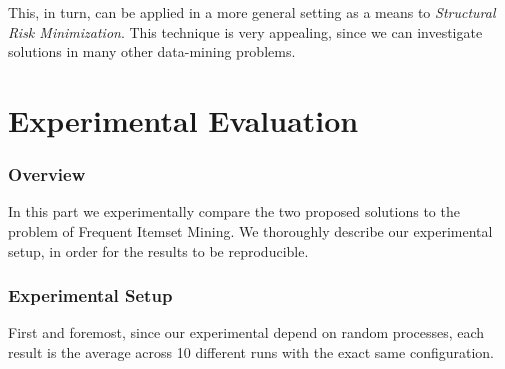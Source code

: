 \documentclass[11pt]{sigplanconf}
\renewcommand\it{\textit}
\begin{document}
This, in turn, can be applied in a more general setting as a means to \it{Structural Risk Minimization}. This technique is very appealing, since we can investigate solutions in many other data-mining problems.

\cleardoublepage
\part{Experimental Evaluation}\label{part2}

\section{Overview}
In this part we experimentally compare the two proposed solutions to the problem of Frequent Itemset Mining.
We thoroughly describe our experimental setup, in order for the results to be reproducible.

\section{Experimental Setup}
First and foremost, since our experimental depend on random processes, each result is the average across 10 different runs with the exact same configuration.
\end{document}
